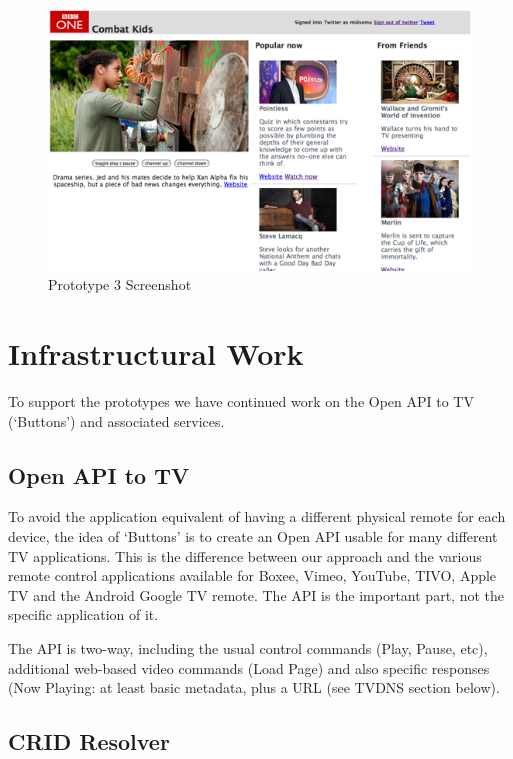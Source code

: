 \documentclass{notube}
\begin{document}
\begin{figure}[htbp]
\begin{center}
\includegraphics[width=6in]{images/prototype3.png}
\caption{Prototype 3 Screenshot} \label{fig:prototype3}
\end{center}
\end{figure}


\chapter{Infrastructural Work}

To support the prototypes we have continued work on the Open API to TV (`Buttons') and associated services.

\section{Open API to TV}

To avoid the application equivalent of having a different physical remote for each device, the idea of `Buttons' is to create an Open API usable for many different TV applications.  This is the difference between our approach and the various remote control applications available for Boxee, Vimeo, YouTube, TIVO, Apple TV and the Android Google TV remote. The API is the important part, not the specific application of it. 

The API is two-way, including the usual control commands (Play, Pause, etc), additional web-based video commands (Load Page) and also specific responses (Now Playing: at least basic metadata, plus a URL (see TVDNS section below).

\section{CRID Resolver}
\end{document}
